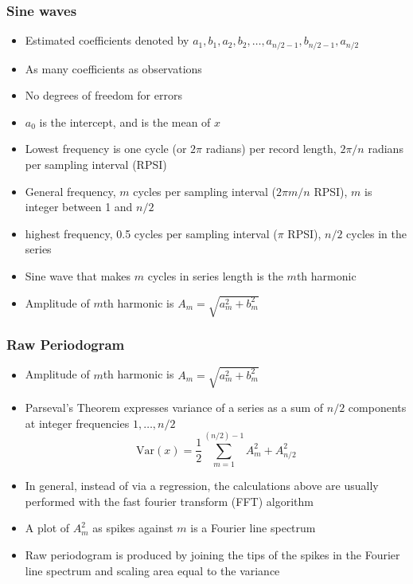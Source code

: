 \documentclass{beamer}
\begin{document}
\begin{frame}
    \frametitle{Sine waves}
    \begin{itemize}
        \item Estimated coefficients denoted by $a_1, b_1, a_2, b_2, \ldots, a_{n/2-1}, b_{n/2-1}, a_{n/2}$
        \item As many coefficients as observations
        \item No degrees of freedom for errors
        \item $a_0$ is the intercept, and is the mean of $x$
        \item Lowest frequency is one cycle (or $2\pi$ radians) per record length, $2\pi / n$ radians per sampling interval (RPSI)
        \item General frequency, $m$ cycles per sampling interval ($2\pi m/n$ RPSI), $m$ is integer between 1 and $n/2$
        \item highest frequency, 0.5 cycles per sampling interval ($\pi$ RPSI), $n/2$ cycles in the series
        \item Sine wave that makes $m$ cycles in series length is the \alert{$m$th harmonic}
        \item Amplitude of $m$th harmonic is $A_m = \sqrt{a^2_m + b^2_m}$
    \end{itemize}
\end{frame}

\begin{frame}
    \frametitle{Raw Periodogram}
    \begin{itemize}
        \item Amplitude of $m$th harmonic is $A_m = \sqrt{a^2_m + b^2_m}$
        \item \alert{Parseval's Theorem} expresses variance of a series as a sum of $n/2$ components at integer frequencies $1, \ldots, n/2$
        $$\mathrm{Var}(x) = \frac{1}{2} \sum_{m=1}^{(n/2)-1} A^2_m + A^2_{n/2}$$
        \item In general, instead of via a regression, the calculations above are usually performed with the \alert{fast fourier transform} (FFT) algorithm
        \item A plot of $A^2_m$ as spikes against $m$ is a \alert{Fourier line spectrum}
        \item \alert{Raw periodogram} is produced by joining the tips of the spikes in the Fourier line spectrum and scaling area equal to the variance
    \end{itemize}
\end{frame}
\end{document}
